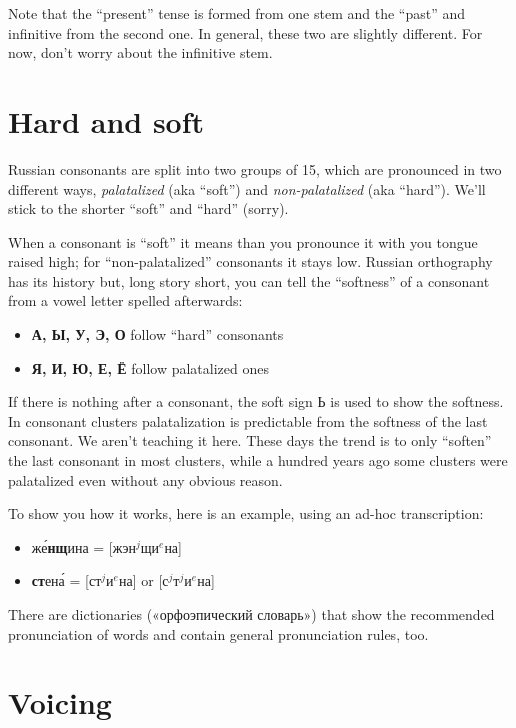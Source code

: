 Note that the ``present'' tense is formed from one stem and the ``past''
and infinitive from the second one. In general, these two are slightly
different. For now, don't worry about the infinitive stem.

\section{Hard and soft}\label{hard-and-soft}

Russian consonants are split into two groups of 15, which are pronounced
in two different ways, \emph{palatalized} (aka ``soft'') and
\emph{non-palatalized} (aka ``hard''). We'll stick to the shorter
``soft'' and ``hard'' (sorry).

When a consonant is ``soft'' it means than you pronounce it with you
tongue raised high; for ``non-palatalized'' consonants it stays low.
Russian orthography has its history but, long story short, you can tell
the ``softness'' of a consonant from a vowel letter spelled afterwards:

\begin{itemize}
\tightlist
\item
  \textbf{А, Ы, У, Э, О} follow ``hard'' consonants
\item
  \textbf{Я, И, Ю, Е, Ё} follow palatalized ones
\end{itemize}

If there is nothing after a consonant, the soft sign Ь is used to show
the softness. In consonant clusters palatalization is predictable from
the softness of the last consonant. We aren't teaching it here. These
days the trend is to only ``soften'' the last consonant in most
clusters, while a hundred years ago some clusters were palatalized even
without any obvious reason.

To show you how it works, here is an example, using an ad-hoc
transcription:

\begin{itemize}
\tightlist
\item
  ж\'{е}\textbf{нщ}ина = {[}жэн$^j$щи$^e$на{]}
\item
  \textbf{ст}ен\'{а} = {[}ст$^j$и$^e$на{]} or {[}с$^j$т$^j$и$^e$на{]}
\end{itemize}

There are dictionaries («орфоэпический словарь») that show the
recommended pronunciation of words and contain general pronunciation
rules, too.

\section{Voicing}\label{voicing}

